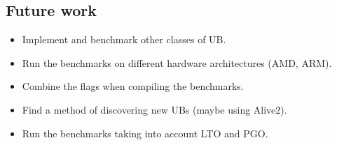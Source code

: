 \documentclass{sciposter}
\begin{document}
\begin{multicols}{3}
\section{Future work}
\begin{itemize}
\item Implement and benchmark other classes of UB.
\item Run the benchmarks on different hardware architectures (AMD, ARM).
\item Combine the flags when compiling the benchmarks.
\item Find a method of discovering new UBs (maybe using Alive2).
\item Run the benchmarks taking into account LTO and PGO.
\end{itemize}


\end{multicols}
\end{document}
